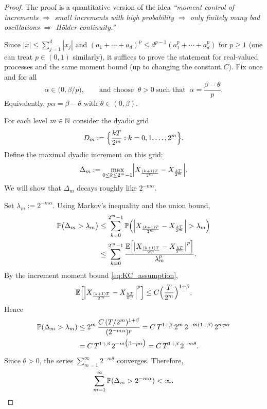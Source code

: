 \begin{proof}[Proof]
The proof is a quantitative version of the idea
\emph{``moment control of increments $\Rightarrow$ small increments with high probability
$\Rightarrow$ only finitely many bad oscillations $\Rightarrow$ H\"older continuity.''}

\medskip
\noindent{}
Since $|x| \le \sum_{j=1}^d |x_j|$ and $(a_1+\cdots+a_d)^p \le d^{p-1}(a_1^p+\cdots+a_d^p)$ for $p\ge 1$
(one can treat $p\in(0,1)$ similarly),
it suffices to prove the statement for real-valued processes and the same moment bound
(up to changing the constant $C$).
Fix once and for all
\[
\alpha\in\bigl(0,\beta/p\bigr),
\qquad \text{and choose }\ \theta>0\ \text{such that }\ \alpha=\frac{\beta-\theta}{p}.
\]
Equivalently, $p\alpha=\beta-\theta$ with $\theta\in(0,\beta)$.

\medskip
\noindent{}
For each level $m\in\mathbb{N}$ consider the dyadic grid
\[
D_m:=\Bigl\{\frac{kT}{2^m}: k=0,1,\dots,2^m\Bigr\}.
\]
Define the maximal dyadic increment on this grid:
\[
\Delta_m := \max_{0\le k\le 2^m-1}\Bigl|X_{\frac{(k+1)T}{2^m}}-X_{\frac{kT}{2^m}}\Bigr|.
\]
We will show that $\Delta_m$ decays roughly like $2^{-m\alpha}$.

Set $\lambda_m := 2^{-m\alpha}$.
Using Markov's inequality and the union bound,
\begin{align*}
\Pp\bigl(\Delta_m > \lambda_m\bigr)
&\le \sum_{k=0}^{2^m-1}
\Pp\Bigl(\Bigl|X_{\frac{(k+1)T}{2^m}}-X_{\frac{kT}{2^m}}\Bigr|>\lambda_m\Bigr)\\
&\le \sum_{k=0}^{2^m-1}
\frac{\E\Bigl[\bigl|X_{\frac{(k+1)T}{2^m}}-X_{\frac{kT}{2^m}}\bigr|^p\Bigr]}{\lambda_m^p}.
\end{align*}
By the increment moment bound \eqref{eq:KC_assumption},
\[
\mathbb{E}\Bigl[\Bigl|X_{\frac{(k+1)T}{2^m}}-X_{\frac{kT}{2^m}}\Bigr|^p\Bigr]
\le C\Bigl(\frac{T}{2^m}\Bigr)^{1+\beta}.
\]
Hence
\begin{align*}
\mathbb{P}(\Delta_m > \lambda_m)
&\le 2^m\,
\frac{C\,(T/2^m)^{1+\beta}}{(2^{-m\alpha})^p}
= C\,T^{1+\beta}\,2^m\,2^{-m(1+\beta)}\,2^{mp\alpha}\\
&= C\,T^{1+\beta}\,2^{-m\bigl(\beta-p\alpha\bigr)}
= C\,T^{1+\beta}\,2^{-m\theta}.
\end{align*}
Since $\theta>0$, the series $\sum_{m=1}^\infty 2^{-m\theta}$ converges. Therefore,
\begin{equation}\label{eq:BC_summable}
\sum_{m=1}^\infty \mathbb{P}(\Delta_m > 2^{-m\alpha}) < \infty.
\end{equation}


\end{proof}
